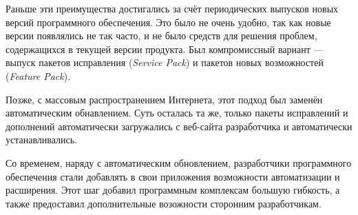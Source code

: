 Раньше эти преимущества достигались за счёт периодических выпусков новых версий программного обеспечения. Это было не очень удобно, так как новые версии появлялись не так часто, и не было средств для решения проблем, содержащихся в текущей версии продукта. Был компромиссный вариант --- выпуск пакетов исправления ({\it Service Pack}) и пакетов новых возможностей ({\it Feature Pack}). 

Позже, с массовым распространением Интернета, этот подход был заменён автоматическим обнавлением. Суть осталась та же, только  пакеты исправлений и дополнений автоматически загружались с веб-сайта разработчика и автоматически устанавливались. 

Со временем, наряду с автоматическим обновлением, разработчики программного обеспечения стали добавлять в свои приложения возможности автоматизации и расширения. Этот шаг добавил программным комплексам большую гибкость, а также предоставил дополнительные возожности сторонним разработчикам. 

\pagebreak